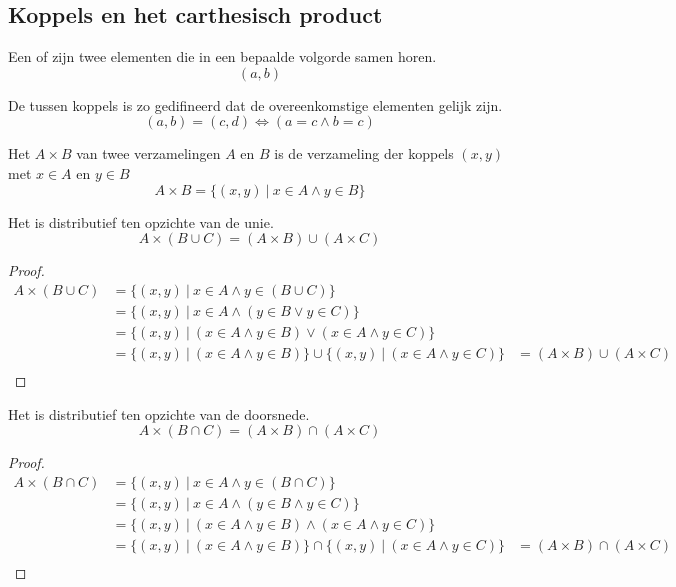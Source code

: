 \documentclass[main.tex]{subfiles}
\begin{document}
\subsection{Koppels en het carthesisch product}
\label{sec:koppels-en-het-carthesisch-product}

\begin{de}
  Een  of  zijn twee elementen die in een bepaalde volgorde samen horen.
  \[ (a,b) \]
\end{de}

\begin{de}
  De  tussen koppels is zo gedifineerd dat de overeenkomstige elementen gelijk zijn.
  \[ (a,b) = (c,d) \Leftrightarrow (a = c \wedge b = c) \] 
\end{de}

\begin{de}
  Het  $A \times B$ van twee verzamelingen $A$ en $B$ is de verzameling der koppels $(x,y)$ met $x \in A$ en $y \in B$
  \[ A \times B = \{ (x,y) \ |\ x \in A \wedge y \in B \} \]
\end{de}

\begin{st}
  Het  is distributief ten opzichte van de unie.
  \[ A \times (B \cup C) = (A \times B) \cup (A \times C) \] 
  \begin{proof}
    \[
    \begin{array}{rll}
    A \times (B \cup C) &= \{ (x,y) \ |\ x \in A \wedge y \in (B \cup C) \}&\\
                        &= \{ (x,y) \ |\ x \in A \wedge (y \in B \vee y \in C) \}&\\
                        &= \{ (x,y) \ |\ (x \in A \wedge y \in B) \vee (x \in A \wedge y \in C) \}&\\
                        &= \{ (x,y) \ |\ (x \in A \wedge y \in B)\} \cup \{ (x,y) \ |\ (x \in A \wedge y \in C) \} &= (A \times B) \cup (A \times C)\\
    \end{array}
    \]
  \end{proof}
\end{st}
\begin{st}
  Het  is distributief ten opzichte van de doorsnede.
  \[ A \times (B \cap C) = (A \times B) \cap (A \times C) \] 
  \begin{proof}
    \[
    \begin{array}{rll}
    A \times (B \cap C) &= \{ (x,y) \ |\ x \in A \wedge y \in (B \cap C) \}&\\
                        &= \{ (x,y) \ |\ x \in A \wedge (y \in B \wedge y \in C) \}&\\
                        &= \{ (x,y) \ |\ (x \in A \wedge y \in B) \wedge (x \in A \wedge y \in C) \}&\\
                        &= \{ (x,y) \ |\ (x \in A \wedge y \in B)\} \cap \{ (x,y) \ |\ (x \in A \wedge y \in C) \} &= (A \times B) \cap (A \times C)\\
    \end{array}
    \]
  \end{proof}
\end{st}
\end{document}
